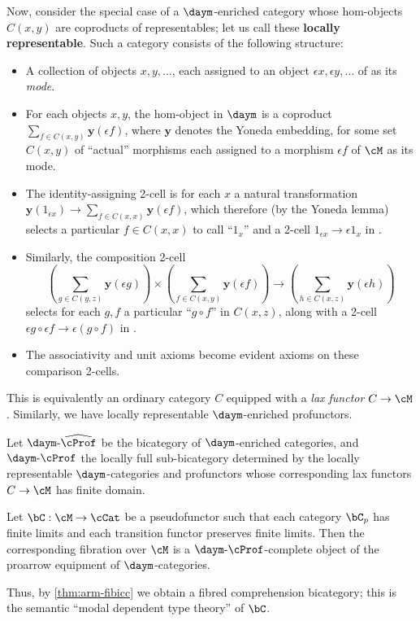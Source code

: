 \documentclass{amsart}
\def\dmprof{\daym\text{-}\cProf}
\def\dmprofh{\daym\text{-}\widehat{\cProf}}
\let\extent\epsilon
\def\yon{\mathbf{y}}
\begin{document}
Now, consider the special case of a $\daym$-enriched category whose hom-objects $C(x,y)$ are coproducts of representables; let us call these \textbf{locally representable}.
Such a category consists of the following structure:
\begin{itemize}
\item A collection of objects $x,y,\dots$, each assigned to an object $\extent x, \extent y,\dots$ of \cM as its \emph{mode}.
\item For each objects $x,y$, the hom-object in $\daym$ is a coproduct $\sum_{f\in C(x,y)} \yon(\extent f)$, where $\yon$ denotes the Yoneda embedding, for some set $C(x,y)$ of ``actual'' morphisms each assigned to a morphism $\extent f$ of $\cM$ as its mode.
\item The identity-assigning 2-cell is for each $x$ a natural transformation $\yon(1_{\extent x}) \to \sum_{f\in C(x,x)} \yon(\extent f)$, which therefore (by the Yoneda lemma) selects a particular $f\in C(x,x)$ to call ``$1_x$'' and a 2-cell $1_{\extent x}\to \extent 1_x$ in \cM.
\item Similarly, the composition 2-cell
  \[ \left(\sum_{g\in C(y,z)} \yon(\extent g)\right) \times \left(\sum_{f\in C(x,y)} \yon(\extent f)\right) \to \left(\sum_{h\in C(x,z)} \yon(\extent h)\right) \]
  selects for each $g,f$ a particular ``$g\circ f$'' in $C(x,z)$, along with a 2-cell $\extent g \circ \extent f \to \extent (g\circ f)$ in \cM.
\item The associativity and unit axioms become evident axioms on these comparison 2-cells.
\end{itemize}
This is equivalently an ordinary category $C$ equipped with a \emph{lax functor} $C\to\cM$.
Similarly, we have locally representable $\daym$-enriched profunctors.

Let $\dmprofh$ be the bicategory of $\daym$-enriched categories, and $\dmprof$ the locally full sub-bicategory determined by the locally representable $\daym$-categories and profunctors whose corresponding lax functors $C\to\cM$ has finite domain.

\begin{conj}
  Let $\bC:\cM\to\cCat$ be a pseudofunctor such that each category $\bC_p$ has finite limits and each transition functor preserves finite limits.
  Then the corresponding fibration over $\cM$ is a $\dmprof$-complete object of the proarrow equipment of $\daym$-categories.
\end{conj}

Thus, by \cref{thm:arm-fibicc} we obtain a fibred comprehension bicategory; this is the semantic ``modal dependent type theory'' of $\bC$.




\end{document}
